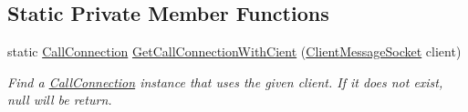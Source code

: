 \subsection*{Static Private Member Functions}
\begin{DoxyCompactItemize}
\item 
static \hyperlink{class_e_l_i_server_1_1_call_connection}{Call\+Connection} \hyperlink{class_e_l_i_server_1_1_message_socket_manager_aa9a1bde31e6bb4d0ef01f974a5784d08}{Get\+Call\+Connection\+With\+Cient} (\hyperlink{class_e_l_i_server_1_1_messaging_1_1_client_message_socket}{Client\+Message\+Socket} client)
\begin{DoxyCompactList}\small\item\em Find a \hyperlink{class_e_l_i_server_1_1_call_connection}{Call\+Connection} instance that uses the given client. If it does not exist, null will be return. \end{DoxyCompactList}\end{DoxyCompactItemize}
